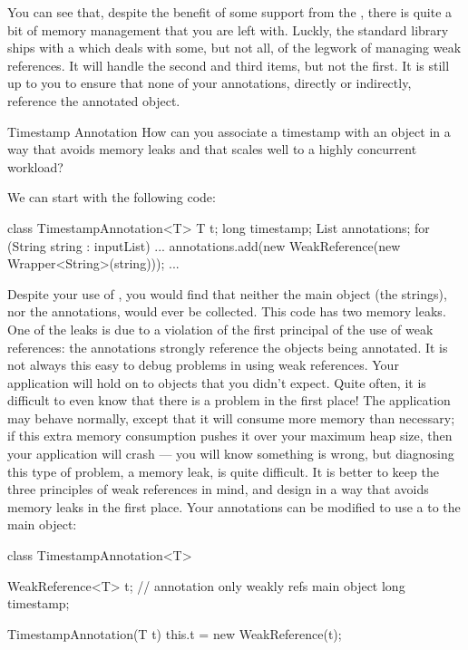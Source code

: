 You can see that, despite the benefit of some support from the \jre, there
is quite a bit of memory management that you are left with. Luckly, the
standard library ships with a  which deals
with some, but not all, of the legwork of managing weak references. It will
handle the second and third items, but not the first. It is still up to you to
ensure that none of your annotations, directly or indirectly, reference the
annotated object. 

\begin{example}{Timestamp Annotation}
How can you associate a timestamp with an object in a way that avoids memory
leaks and that scales well to a highly concurrent workload?
\end{example}

We can start with the following code:

\begin{shortlisting}
class TimestampAnnotation<T> {
	T t;
	long timestamp;
}
List annotations;
for (String string : inputList) {
	...
	annotations.add(new WeakReference(new Wrapper<String>(string)));
	...
}
\end{shortlisting}

Despite your use of , you would find that neither the main
object (the strings), nor the annotations, would ever be collected. This code
has two memory leaks. One of the leaks is due to a
violation of the first principal of the use of weak references: the annotations
strongly reference the objects being annotated. It is not always this easy to
debug problems in using weak references. Your application will hold on to objects
that you didn't expect. Quite often, it is difficult to even know that there is a
problem in the first place! The application may behave normally, except that it
will consume more memory than necessary; if this extra memory consumption pushes
it over your maximum heap size, then your application will crash --- you will
know something is wrong, but diagnosing this type of problem, a memory
leak, is quite difficult. It is better to keep the
three principles of weak references in mind, and design in a way that avoids
memory leaks in the first place. Your annotations can be modified to use a
 to the main object:

\begin{shortlisting}
class TimestampAnnotation<T> {
	WeakReference<T> t; // annotation only weakly refs main object
	long timestamp;
	
	TimestampAnnotation(T t) {
		this.t = new WeakReference(t);
	}
}
\end{shortlisting}

